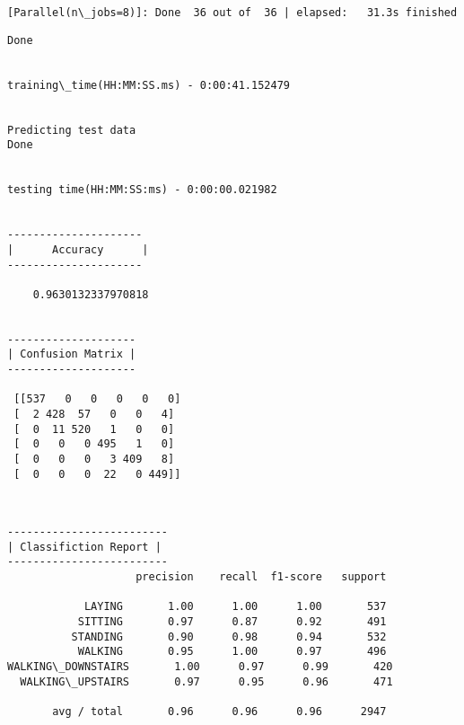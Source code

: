 \documentclass[11pt]{article}
\begin{document}
    \begin{Verbatim}[commandchars=\\\{\}]
[Parallel(n\_jobs=8)]: Done  36 out of  36 | elapsed:   31.3s finished

    \end{Verbatim}

    \begin{Verbatim}[commandchars=\\\{\}]
Done 
 

training\_time(HH:MM:SS.ms) - 0:00:41.152479


Predicting test data
Done 
 

testing time(HH:MM:SS:ms) - 0:00:00.021982


---------------------
|      Accuracy      |
---------------------

    0.9630132337970818


--------------------
| Confusion Matrix |
--------------------

 [[537   0   0   0   0   0]
 [  2 428  57   0   0   4]
 [  0  11 520   1   0   0]
 [  0   0   0 495   1   0]
 [  0   0   0   3 409   8]
 [  0   0   0  22   0 449]]

    \end{Verbatim}

    \begin{center}
    \end{center}
    { \hspace*{\fill} \\}
    
    \begin{Verbatim}[commandchars=\\\{\}]
-------------------------
| Classifiction Report |
-------------------------
                    precision    recall  f1-score   support

            LAYING       1.00      1.00      1.00       537
           SITTING       0.97      0.87      0.92       491
          STANDING       0.90      0.98      0.94       532
           WALKING       0.95      1.00      0.97       496
WALKING\_DOWNSTAIRS       1.00      0.97      0.99       420
  WALKING\_UPSTAIRS       0.97      0.95      0.96       471

       avg / total       0.96      0.96      0.96      2947


    \end{Verbatim}
\end{document}
